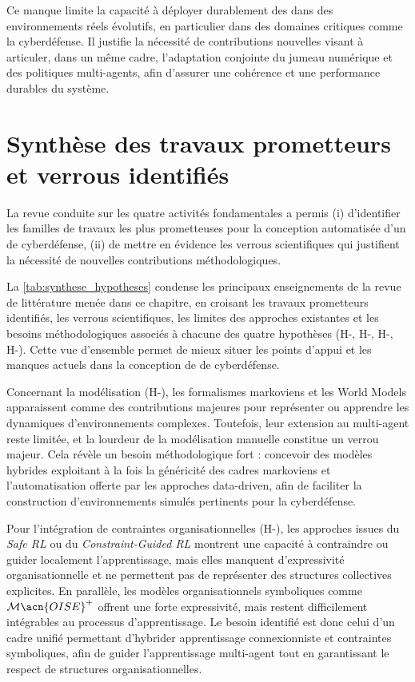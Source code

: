 Ce manque limite la capacité à déployer durablement des  dans des environnements réels évolutifs, en particulier dans des domaines critiques comme la cyberdéfense. Il justifie la nécessité de contributions nouvelles visant à articuler, dans un même cadre, l’adaptation conjointe du jumeau numérique et des politiques multi-agents, afin d’assurer une cohérence et une performance durables du système.


\section*{Synthèse des travaux prometteurs et verrous identifiés}

La revue conduite sur les quatre activités fondamentales a permis
(i) d’identifier les familles de travaux les plus prometteuses pour la conception automatisée d’un  de cyberdéfense,
(ii) de mettre en évidence les verrous scientifiques qui justifient la nécessité de nouvelles contributions méthodologiques.



\noindent
La \autoref{tab:synthese_hypotheses} condense les principaux enseignements de la revue de littérature menée dans ce chapitre, en croisant les travaux prometteurs identifiés, les verrous scientifiques, les limites des approches existantes et les besoins méthodologiques associés à chacune des quatre hypothèses (H-, H-, H-, H-). Cette vue d’ensemble permet de mieux situer les points d’appui et les manques actuels dans la conception de  de cyberdéfense.

Concernant la modélisation (H-), les formalismes markoviens et les World Models apparaissent comme des contributions majeures pour représenter ou apprendre les dynamiques d’environnements complexes. Toutefois, leur extension au multi-agent reste limitée, et la lourdeur de la modélisation manuelle constitue un verrou majeur. Cela révèle un besoin méthodologique fort : concevoir des modèles hybrides exploitant à la fois la généricité des cadres markoviens et l’automatisation offerte par les approches data-driven, afin de faciliter la construction d’environnements simulés pertinents pour la cyberdéfense.

Pour l’intégration de contraintes organisationnelles (H-), les approches issues du \textit{Safe RL} ou du \textit{Constraint-Guided RL} montrent une capacité à contraindre ou guider localement l’apprentissage, mais elles manquent d’expressivité organisationnelle et ne permettent pas de représenter des structures collectives explicites. En parallèle, les modèles organisationnels symboliques comme $\mathcal{M}\acn{OISE}^+$ offrent une forte expressivité, mais restent difficilement intégrables au processus d’apprentissage. Le besoin identifié est donc celui d’un cadre unifié permettant d’hybrider apprentissage connexionniste et contraintes symboliques, afin de guider l’apprentissage multi-agent tout en garantissant le respect de structures organisationnelles.

